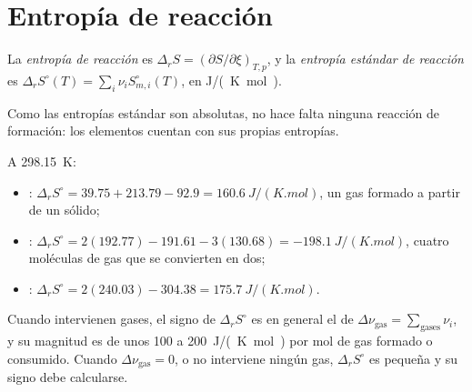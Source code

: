 \section{Entropía de reacción}

\begin{definition}\label{def:b2:reaction-free-energy:reaction-entropy}
La \emph{entropía de reacción} es $\Delta_r S =
(\partial S/\partial\xi)_{T,p}$, y la \emph{entropía estándar de
reacción} es $\Delta_r S^\circ(T) =
\sum_i\nu_iS^\circ_{m,i}(T)$, en \unit{J/(K.mol)}.
\end{definition}

Como las entropías estándar son absolutas, no hace falta ninguna reacción de formación:
los elementos cuentan con sus propias entropías.

\begin{example}\label{ex:b2:reaction-free-energy:entropies}
A \qty{298.15}{K}:
\begin{itemize}
  \item {}: $\Delta_r S^\circ = 39.75 + 213.79 -
        92.9 = \qty{+160.6}{J/(K.mol)}$, un gas formado a partir de un sólido;
  \item {}: $\Delta_r S^\circ = 2(192.77) -
        191.61 - 3(130.68) = \qty{-198.1}{J/(K.mol)}$, cuatro moléculas de gas
        que se convierten en dos;
  \item {}: $\Delta_r S^\circ = 2(240.03) - 304.38 =
        \qty{+175.7}{J/(K.mol)}$.
\end{itemize}
\end{example}

\begin{proposition}\label{prop:b2:reaction-free-energy:sign-rule}
Cuando intervienen gases, el signo de $\Delta_r S^\circ$ es en general el de
$\Delta\nu_{\text{gas}} = \sum_{\text{gases}}\nu_i$, y su magnitud es de unos
\qty{100}{} a \qty{200}{J/(K.mol)} por mol de gas formado o consumido. Cuando
$\Delta\nu_{\text{gas}} = 0$, o no interviene ningún gas, $\Delta_r S^\circ$ es
pequeña y su signo debe calcularse.
\end{proposition}

